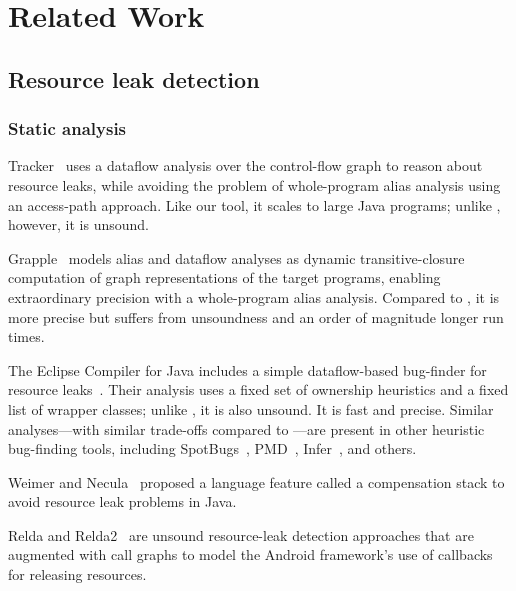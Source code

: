 \section{Related Work}
\label{sec:relatedwork}

\subsection{Resource leak detection}
\label{sec:rw-resource-leaks}



\subsubsection{Static analysis}

Tracker~\cite{TorlakC10} uses a dataflow analysis over the control-flow
graph to reason about resource leaks, while avoiding the problem of
whole-program alias analysis using an access-path approach. Like our tool,
it scales to large Java programs; unlike \tool, however, it is unsound.

Grapple~\cite{zuo2019grapple} models alias and dataflow analyses as
dynamic transitive-closure computation of graph representations of
the target programs, enabling extraordinary precision with a whole-program
alias analysis. Compared to \tool, it is more precise but suffers
from unsoundness and an order of magnitude longer run times.

The Eclipse Compiler for Java includes a simple dataflow-based
bug-finder for resource leaks~\cite{ecj-resource-leak}. Their analysis
uses a fixed set of ownership heuristics and a fixed list of wrapper
classes; unlike \tool, it is also unsound. It is fast and
 precise.  Similar analyses---with similar trade-offs
compared to \tool---are present in other heuristic bug-finding tools,
including SpotBugs~\cite{spotbugs-resource-leak},
PMD~\cite{pmd-resource-leak}, Infer~\cite{infer-resource-leak}, and others.

Weimer and Necula~\cite{WeimerN04} proposed a language feature called
a compensation stack to avoid resource leak problems in Java.

Relda and Relda2~\cite{guo2013characterizing,wu2016relda2} are unsound
resource-leak detection approaches that are augmented with call graphs
to model the Android framework's use of callbacks for releasing
resources.

